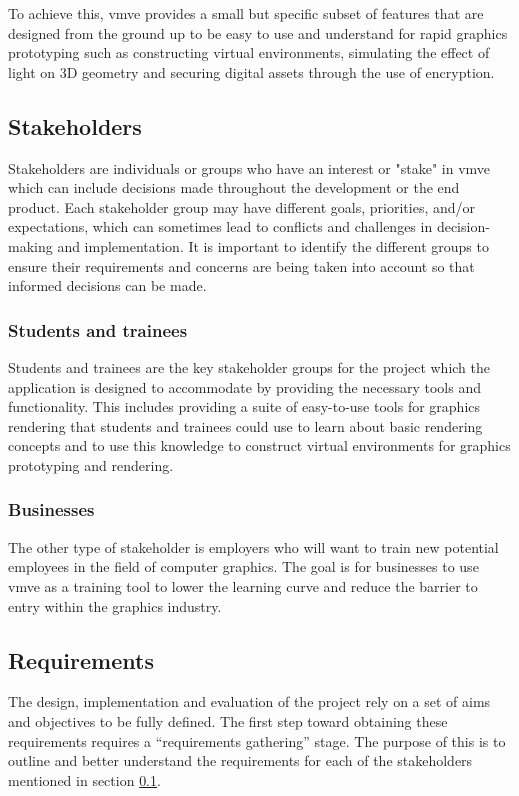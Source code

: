 \documentclass[11pt]{article}
\begin{document}
To achieve this, \gls*{vmve} provides a small but specific subset of features
that are designed from the ground up to be easy to use and understand for rapid
graphics prototyping such as constructing virtual environments, simulating the
effect of light on 3D geometry and securing digital assets through the use of
encryption.

\subsection{Stakeholders} \label{stakeholders}
Stakeholders are individuals or groups who have an interest or "stake" in
\gls*{vmve} which can include decisions made throughout the development or the
end product. Each stakeholder group may have different goals, priorities, and/or
expectations, which can sometimes lead to conflicts and challenges in
decision-making and implementation. It is important to identify the different
groups to ensure their requirements and concerns are being taken into account so
that informed decisions can be made.

\subsubsection{Students and trainees}
Students and trainees are the key stakeholder groups for the project which the
application is designed to accommodate by providing the necessary tools and
functionality. This includes providing a suite of easy-to-use tools for graphics
rendering that students and trainees could use to learn about basic rendering
concepts and to use this knowledge to construct virtual environments for
graphics prototyping and rendering.

\subsubsection{Businesses}
The other type of stakeholder is employers who will want to train new potential
employees in the field of computer graphics. The goal is for businesses to use
\gls*{vmve} as a training tool to lower the learning curve and reduce the
barrier to entry within the graphics industry.

\subsection{Requirements}
The design, implementation and evaluation of the project rely on a set of aims
and objectives to be fully defined. The first step toward obtaining these
requirements requires a ``requirements gathering'' stage. The purpose of this
is to outline and better understand the requirements for each of the
stakeholders mentioned in section \ref{stakeholders}.
\end{document}
